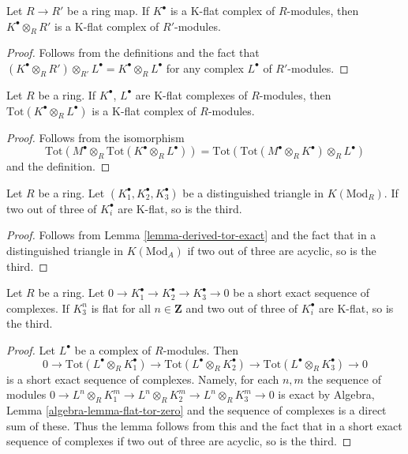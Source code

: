 \begin{lemma}
\label{lemma-base-change-K-flat}
Let $R \to R'$ be a ring map. If $K^\bullet$ is a K-flat complex
of $R$-modules, then $K^\bullet \otimes_R R'$ is a K-flat complex
of $R'$-modules.
\end{lemma}

\begin{proof}
Follows from the definitions and the fact that
$(K^\bullet \otimes_R R') \otimes_{R'} L^\bullet =
K^\bullet \otimes_R L^\bullet$ for any complex
$L^\bullet$ of $R'$-modules.
\end{proof}

\begin{lemma}
\label{lemma-tensor-product-K-flat}
Let $R$ be a ring. If $K^\bullet$, $L^\bullet$ are K-flat complexes
of $R$-modules, then $\text{Tot}(K^\bullet \otimes_R L^\bullet)$ is a
K-flat complex of $R$-modules.
\end{lemma}

\begin{proof}
Follows from the isomorphism
$$
\text{Tot}(M^\bullet \otimes_R \text{Tot}(K^\bullet \otimes_R L^\bullet))
=
\text{Tot}(\text{Tot}(M^\bullet \otimes_R K^\bullet) \otimes_R L^\bullet)
$$
and the definition.
\end{proof}

\begin{lemma}
\label{lemma-K-flat-two-out-of-three}
Let $R$ be a ring. Let $(K_1^\bullet, K_2^\bullet, K_3^\bullet)$ be
a distinguished triangle in $K(\text{Mod}_R)$. If two out of three
of $K_i^\bullet$ are K-flat, so is the third.
\end{lemma}

\begin{proof}
Follows from
Lemma \ref{lemma-derived-tor-exact}
and the fact that in a distinguished triangle in
$K(\text{Mod}_A)$ if two out of three are acyclic, so is the third.
\end{proof}

\begin{lemma}
\label{lemma-K-flat-two-out-of-three-ses}
Let $R$ be a ring. Let
$0 \to K_1^\bullet \to K_2^\bullet \to K_3^\bullet \to 0$ be
a short exact sequence of complexes. If $K_3^n$ is flat for
all $n \in \mathbf{Z}$ and two out of three
of $K_i^\bullet$ are K-flat, so is the third.
\end{lemma}

\begin{proof}
Let $L^\bullet$ be a complex of $R$-modules. Then
$$
0 \to
\text{Tot}(L^\bullet \otimes_R K_1^\bullet) \to
\text{Tot}(L^\bullet \otimes_R K_2^\bullet) \to
\text{Tot}(L^\bullet \otimes_R K_3^\bullet) \to 0
$$
is a short exact sequence of complexes. Namely, for each
$n, m$ the sequence of modules
$0 \to L^n \otimes_R K_1^m \to
L^n \otimes_R K_2^m \to
L^n \otimes_R K_3^m \to 0$
is exact by Algebra, Lemma \ref{algebra-lemma-flat-tor-zero}
and the sequence of complexes is a direct sum of these.
Thus the lemma follows from this
and the fact that in a short exact sequence of complexes
if two out of three are acyclic, so is the third.
\end{proof}

